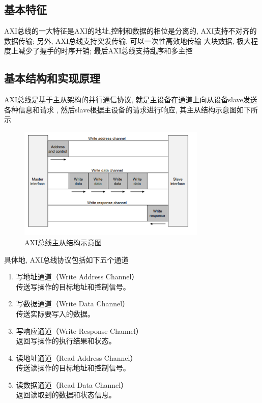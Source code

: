 \documentclass[14pt]{article}
\begin{document}
\subsection{基本特征}
AXI总线的一大特征是AXI的地址,控制和数据的相位是分离的, AXI支持不对齐的数据传输; 另外, AXI总线支持突发传输, 可以一次性高效地传输
大块数据, 极大程度上减少了握手的时序开销; 最后AXI总线支持乱序和多主控

\subsection{基本结构和实现原理}
AXI总线是基于主从架构的并行通信协议, 就是主设备在通道上向从设备slave发送各种信息和请求 , 然后slave根据主设备的请求进行响应, 其主从结构示意图如下所示

\begin{figure}[H]
    \centering
    \includegraphics[width=0.8\textwidth]{AXI.jpg}
    \caption{AXI总线主从结构示意图}
\end{figure}
\newpage
具体地, AXI总线协议包括如下五个通道
\begin{enumerate}
    \item 写地址通道（Write Address Channel）\\
传送写操作的目标地址和控制信号。
\item 写数据通道（Write Data Channel）\\
传送实际要写入的数据。
\item 写响应通道（Write Response Channel）\\
返回写操作的执行结果和状态。
\item 读地址通道（Read Address Channel）\\
传送读操作的目标地址和控制信号。
\item 读数据通道（Read Data Channel）\\
返回读取到的数据和状态信息。
\end{enumerate}
\end{document}
